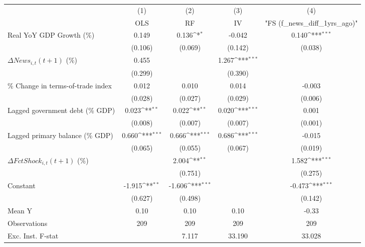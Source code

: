 {
\def\sym#1{\ifmmode^{#1}\else\(^{#1}\)\fi}
\begin{tabular}{l*{4}{c}}
\toprule
                    &\multicolumn{1}{c}{(1)}&\multicolumn{1}{c}{(2)}&\multicolumn{1}{c}{(3)}&\multicolumn{1}{c}{(4)}\\
                    &\multicolumn{1}{c}{OLS}&\multicolumn{1}{c}{RF}&\multicolumn{1}{c}{IV}&\multicolumn{1}{c}{ "FS (f_news_diff_1yrs_ago)" }\\
\midrule
Real YoY GDP Growth (\%)&       0.149         &       0.136\sym{*}  &      -0.042         &       0.140\sym{***}\\
                    &     (0.106)         &     (0.069)         &     (0.142)         &     (0.038)         \\
\addlinespace
$ \Delta News_{i,t}(t+1)$ (\%)&       0.455         &                     &       1.267\sym{***}&                     \\
                    &     (0.299)         &                     &     (0.390)         &                     \\
\addlinespace
\% Change in terms-of-trade index&       0.012         &       0.010         &       0.014         &      -0.003         \\
                    &     (0.028)         &     (0.027)         &     (0.029)         &     (0.006)         \\
\addlinespace
Lagged government debt (\% GDP)&       0.023\sym{**} &       0.022\sym{**} &       0.020\sym{***}&       0.001         \\
                    &     (0.008)         &     (0.007)         &     (0.007)         &     (0.001)         \\
\addlinespace
Lagged primary balance (\% GDP)&       0.660\sym{***}&       0.666\sym{***}&       0.686\sym{***}&      -0.015         \\
                    &     (0.065)         &     (0.055)         &     (0.067)         &     (0.019)         \\
\addlinespace
$ \Delta FctShock_{i,t}(t+1)$ (\%)&                     &       2.004\sym{**} &                     &       1.582\sym{***}\\
                    &                     &     (0.751)         &                     &     (0.275)         \\
\addlinespace
Constant            &      -1.915\sym{**} &      -1.606\sym{***}&                     &      -0.473\sym{***}\\
                    &     (0.627)         &     (0.498)         &                     &     (0.142)         \\
\midrule
Mean Y              &        0.10         &        0.10         &        0.10         &       -0.33         \\
Observations        &         209         &         209         &         209         &         209         \\
Exc. Inst. F-stat   &                     &       7.117         &      33.190         &      33.028         \\
\bottomrule
\end{tabular}
}
